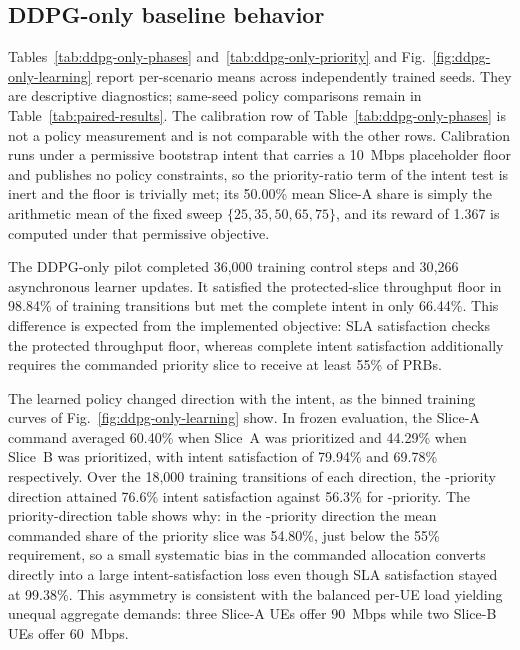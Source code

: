 \subsection{DDPG-only baseline behavior}


\ifFullCampaign
Tables~\ref{tab:ddpg-only-phases} and~\ref{tab:ddpg-only-priority} and Fig.~\ref{fig:ddpg-only-learning} report per-scenario means across independently trained seeds. They are descriptive diagnostics; same-seed policy comparisons remain in Table~\ref{tab:paired-results}.
\else
The calibration row of Table~\ref{tab:ddpg-only-phases} is not a policy measurement and is not
comparable with the other rows. Calibration runs under a permissive bootstrap intent that
carries a 10~Mbps placeholder floor and publishes no policy constraints, so the priority-ratio
term of the intent test is inert and the floor is trivially met; its 50.00\% mean Slice-A
share is simply the arithmetic mean of the fixed sweep $\{25,35,50,65,75\}$, and its reward of
1.367 is computed under that permissive objective.

The DDPG-only pilot completed 36{,}000 training control steps and 30{,}266 asynchronous
learner updates. It satisfied the protected-slice throughput floor in 98.84\% of training
transitions but met the complete intent in only 66.44\%. This difference is expected from the
implemented objective: SLA satisfaction checks the protected throughput floor, whereas
complete intent satisfaction additionally requires the commanded priority slice to receive at
least 55\% of PRBs.

The learned policy changed direction with the intent, as the binned training curves of
Fig.~\ref{fig:ddpg-only-learning} show. In frozen evaluation, the Slice-A
command averaged 60.40\% when Slice~A was prioritized and 44.29\% when Slice~B was
prioritized, with intent satisfaction of 79.94\% and 69.78\% respectively. Over the 18{,}000
training transitions of each direction, the \snssaiA-priority direction attained 76.6\% intent
satisfaction against 56.3\% for \snssaiB-priority. The priority-direction table shows why: in
the \snssaiB-priority direction the mean commanded share of the priority slice was 54.80\%,
just below the 55\% requirement, so a small systematic bias in the commanded allocation
converts directly into a large intent-satisfaction loss even though SLA satisfaction stayed at
99.38\%. This asymmetry is consistent with the balanced per-UE load yielding unequal aggregate
demands: three Slice-A UEs offer 90~Mbps while two Slice-B UEs offer 60~Mbps.

